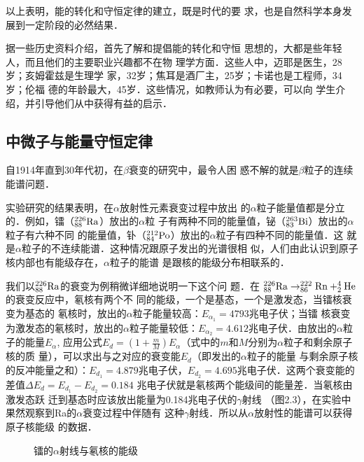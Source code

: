 以上表明，能的转化和守恒定律的建立，既是时代的要
求，也是自然科学本身发展到一定阶段的必然结果．

据一些历史资料介绍，首先了解和提倡能的转化和守恒
思想的，大都是些年轻人，而且他们的主要职业兴趣都不在物
理学方面．这些人中，迈耶是医生，28岁；亥姆霍兹是生理学
家，32岁；焦耳是酒厂主，25岁；卡诺也是工程师，34岁；伦福
德的年龄最大，45岁．这些情况，如教师认为有必要，可以向
学生介绍，并引导他们从中获得有益的启示．

\subsection{中微子与能量守恒定律}
自1914年直到30年代初，在$\beta$衰变的研究中，最令人困
惑不解的就是$\beta$粒子的连续能谱问题．

实验研究的结果表明，在$\alpha$放射性元素衰变过程中放出
的$\alpha$粒子能量值都是分立的．例如，镭（$^{226}_{88}{\rm Ra}$）放出的$\alpha$粒
子有两种不同的能量值，铋（$^{263}_{83}{\rm Bi}$）放出的$\alpha$粒子有六种不同
的能量值，钋（$^{212}_{84}{\rm Po}$）放出的$\alpha$粒子有四种不同的能量值．这
就是$\alpha$粒子的不连续能谱．这种情况跟原子发出的光谱很相
似，人们由此认识到原子核内部也有能级存在，$\alpha$粒子的能谱
是跟核的能级分布相联系的．

我们以$^{226}_{88}{\rm Ra}$的衰变为例稍微详细地说明一下这个问
题．在
$^{226}_{88}{\rm Ra}\to ^{222}_{86}{\rm Rn}+^{4}_{2}{\rm He}$的衰变反应中，氡核有两个不
同的能级，一个是基态，一个是激发态，当镭核衰变为基态的
氡核时，放出的$\alpha$粒子能量较高：$E_{\alpha_1}=4793$兆电子伏；当镭
核衰变为激发态的氡核时，放出的$\alpha$粒子能量较低：$E_{\alpha_2}=
4.612$兆电子伏．由放出的$\alpha$粒子的能量$E_{\alpha}$, 应用公式$E_d=\left(1+\frac{m}{M}\right)E_{\alpha}$（式中的$m$和$M$分别为$\alpha$粒子和剩余原子核的质
量），可以求出与之对应的衰变能$E_d$（即发出的$\alpha$粒子的能量
与剩余原子核的反冲能量之和）：$E_{d_1}=4.879$兆电子伏，$E_{d_2}=
4.695$兆电子伏．这两个衰变能的差值$\Delta E_{d}=E_{d_1}-E_{d_2}=0.184$
兆电子伏就是氡核两个能级间的能量差．当氡核由激发态跃
迁到基态时应该放出能量为0.184兆电子伏的$\gamma$射线
（图2.3），在实验中果然观察到Ra的$\alpha$衰变过程中伴随有
这种$\gamma$射线．所以从$\alpha$放射性的能谱可以获得原子核能级
的数据．
\begin{figure}[htp]
    \centering
{}
    \caption{镭的$\alpha$射线与氡核的能级}
\end{figure}

